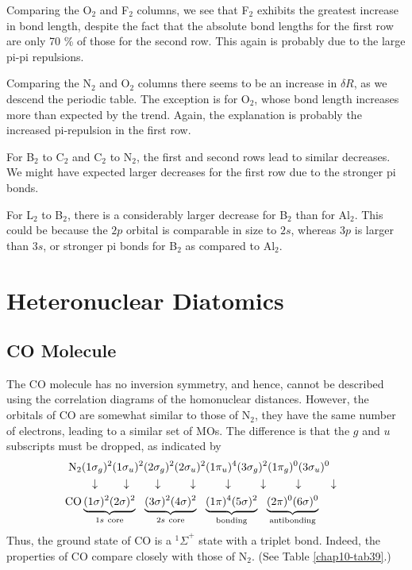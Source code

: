Comparing the O$_2$ and F$_2$ columns, we see that F$_2$ exhibits 
the greatest increase in bond length, despite the fact 
that the absolute bond lengths for the first row are only 
70 \% of those for the second row.  This again is probably 
due to the large pi-pi repulsions.

Comparing the N$_2$ and O$_2$ columns there seems to be an increase 
in $\delta R$, 
as we descend the periodic table. The exception is for O$_2$, whose 
bond length increases more than expected by the trend.  Again, the 
explanation is probably the increased pi-repulsion in the first row.

For B$_2$ to C$_2$ and C$_2$ to N$_2$, the first and second rows lead to 
similar decreases.  We might have expected larger decreases 
for the first row due to the stronger pi bonds.
	
For L$_2$ to B$_2$, there is a considerably larger decrease for B$_2$ 
than for Al$_2$.  This could be because the $2p$ orbital is 
comparable in size to $2s$, whereas $3p$ is larger than $3s$, or 
stronger pi bonds for B$_2$ as compared to Al$_2$.

\section{Heteronuclear Diatomics}

\subsection{CO Molecule}

The CO molecule has no inversion symmetry, and hence, cannot be 
described using the correlation diagrams of the homonuclear 
distances.  However, the orbitals of CO are somewhat similar to 
those of N$_2$, they have the same number of electrons, leading 
to a similar set of MOs.  The difference 
is that the $g$ and $u$ subscripts must be dropped, as indicated by
\begin{eqnarray}
{\rm N}_2 & (1 \sigma_g)^2 (1 \sigma_u)^2 (2 \sigma_g)^2
(2 \sigma_u)^2 (1 \pi_u)^4 (3 \sigma_g)^2 (1 \pi_g)^0 (3 
\sigma_u)^0\cr
& ~~\downarrow~~~~~~~\downarrow~~~~~~~\downarrow~~~~~~~~
\downarrow~~~~~~~~\downarrow~~~~~~~~\downarrow~~~~~~~~
\downarrow~~~~~~~~\downarrow\cr
{\rm CO} & \underbrace{(1 \sigma)^2 (2 \sigma)^2}_{1s~{\rm core}}~~
\underbrace{(3 \sigma)^2 (4 \sigma)^2}_{2s~{\rm core}}~~
\underbrace{(1 \pi)^4 (5 \sigma)^2}_{\rm bonding}~~
\underbrace{(2 \pi)^0 (6 \sigma)^0}_{\rm antibonding}
\end{eqnarray}
Thus, the ground state of CO is a ${^1\Sigma}^+$ state with a triplet 
bond. Indeed, the properties of CO compare closely with those of 
N$_2$.  (See Table \ref{chap10-tab39}.)

